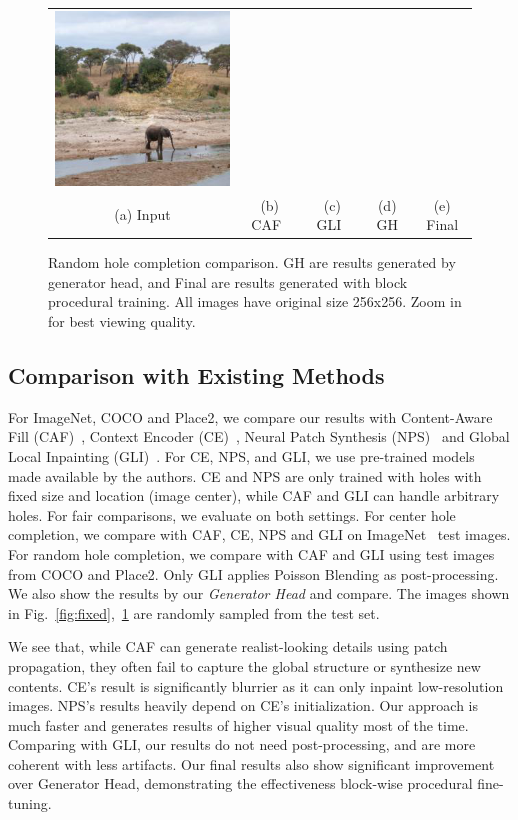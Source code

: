 \begin{figure}[h!]
\begin{tabular}{ccccc}
\includegraphics[width=.2\textwidth]{figures/random/000000286994.jpg}\\
(a) Input & (b) CAF~\cite{barnes2009patchmatch} & (c) GLI~\cite{iizuka2017globally} & (d) GH & (e) Final \\
\end{tabular}
\caption{Random hole completion comparison. GH are results generated by generator head, and Final are results generated with block procedural training. All images have original size 256x256. Zoom in for best viewing quality.}
\label{fig:random}
\vspace{-10pt}
\end{figure}

\subsection{Comparison with Existing Methods}
\label{exp:comparison}
For ImageNet, COCO and Place2, we compare our results with Content-Aware Fill (CAF)~\cite{barnes2009patchmatch}, Context Encoder (CE)~\cite{pathak2016context}, Neural Patch Synthesis (NPS)~\cite{yang2017high} and Global Local Inpainting (GLI)~\cite{iizuka2017globally}. For CE, NPS, and GLI, we use pre-trained models made available by the authors. CE and NPS are only trained with holes with fixed size and location (image center), while CAF and GLI can handle arbitrary holes. For fair comparisons, we evaluate on both settings. For center hole completion, we compare with CAF, CE, NPS and GLI on ImageNet~\cite{russakovsky2015imagenet} test images. For random hole completion, we compare with CAF and GLI using test images from COCO and Place2. Only GLI applies Poisson Blending as post-processing. We also show the results by our \textit{Generator Head} and compare. The images shown in Fig.~\ref{fig:fixed},~\ref{fig:random} are randomly sampled from the test set. 

We see that, while CAF can generate realist-looking details using patch propagation, they often fail to capture the global structure or synthesize new contents. CE's result is significantly blurrier as it can only inpaint low-resolution images. NPS's results heavily depend on CE's initialization. Our approach is much faster and generates results of higher visual quality most of the time. Comparing with GLI, our results do not need post-processing, and are more coherent with less artifacts. Our final results also show significant improvement over Generator Head, demonstrating the effectiveness block-wise procedural fine-tuning.

